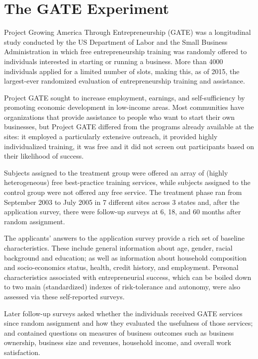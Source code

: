 
\section{The GATE Experiment}
\label{sec:GATE}

Project Growing America Through Entrepreneurship (GATE) was a longitudinal study conducted by the US Department of Labor and the Small Business Administration in which free entrepreneurship training was randomly offered to individuals interested in starting or running a business. More than 4000 individuals applied for a limited number of slots, making this, as of 2015, the largest-ever randomized evaluation of entrepreneurship training and assistance.

Project GATE sought to increase employment, earnings, and self-sufficiency by promoting economic development in low-income areas. Most communities have organizations that provide assistance to people who want to start their own businesses, but Project GATE differed from the programs already available at the sites: it employed a particularly extensive outreach, it provided highly individualized training, it was free and it did not screen out participants based on their likelihood of success.

Subjects assigned to the treatment group were offered an array of (highly heterogeneous) free best-practice training services, while subjects assigned to the control group were not offered any free service. The treatment phase ran from September 2003 to July 2005 in 7 different sites across 3 states and, after the application survey, there were follow-up surveys at 6, 18, and 60 months after random assignment.

The applicants' answers to the application survey provide a rich set of baseline characteristics. These include general information about age, gender, racial background and education; as well as information about household composition and socio-economics status, health, credit history, and employment. Personal characteristics associated with entrepreneurial success, which can be boiled down to two main (standardized) indexes of risk-tolerance and autonomy, were also assessed via these self-reported surveys.

Later follow-up surveys asked whether the individuals received GATE services since random assignment and how they evaluated the usefulness of those services; and contained questions on measures of business outcomes such as business ownership, business size and revenues, household income, and overall work satisfaction.

